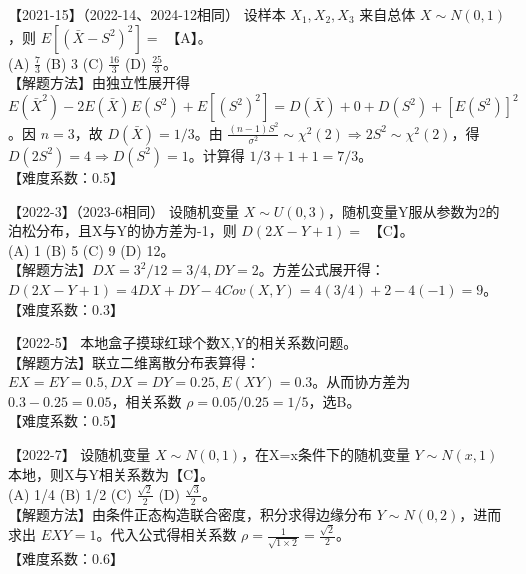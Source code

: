 \documentclass[zihao=4, a4paper, fontset=mac]{ctexart}
\begin{document}
\par\vspace{\baselineskip}

【2021-15】（2022-14、2024-12相同） 设样本 $X_1,X_2,X_3$ 来自总体 $X\sim N(0,1)$，则 $E[(\bar{X}-S^2)^2]=$ 【A】。\\
(A) $\frac{7}{3}$ \quad (B) 3 \quad (C) $\frac{16}{3}$ \quad (D) $\frac{25}{3}$。\\
【解题方法】由独立性展开得 $E(\bar{X}^2) - 2E(\bar{X})E(S^2) + E[(S^2)^2] = D(\bar{X}) + 0 + D(S^2) + [E(S^2)]^2$。因 $n=3$，故 $D(\bar{X})=1/3$。由 $\frac{(n-1)S^2}{\sigma^2} \sim \chi^2(2) \Rightarrow 2S^2 \sim \chi^2(2)$，得 $D(2S^2)=4 \Rightarrow D(S^2)=1$。计算得 $1/3 + 1 + 1 = 7/3$。\\
【难度系数：0.5】

\par\vspace{\baselineskip}

【2022-3】（2023-6相同） 设随机变量 $X\sim U(0,3)$，随机变量Y服从参数为2的泊松分布，且X与Y的协方差为-1，则 $D(2X-Y+1)=$ 【C】。\\
(A) 1 \quad (B) 5 \quad (C) 9 \quad (D) 12。\\
【解题方法】$DX = 3^2/12 = 3/4, DY = 2$。方差公式展开得：$D(2X-Y+1)=4DX+DY-4Cov(X,Y) = 4(3/4) + 2 - 4(-1) = 9$。\\
【难度系数：0.3】

\par\vspace{\baselineskip}

【2022-5】 本地盒子摸球红球个数X,Y的相关系数问题。\\
【解题方法】联立二维离散分布表算得：$EX=EY=0.5, DX=DY=0.25, E(XY)=0.3$。从而协方差为 $0.3-0.25=0.05$，相关系数 $\rho = 0.05/0.25 = 1/5$，选B。\\
【难度系数：0.5】

\par\vspace{\baselineskip}

【2022-7】 设随机变量 $X\sim N(0,1)$，在X=x条件下的随机变量 $Y\sim N(x,1)$本地，则X与Y相关系数为【C】。\\
(A) 1/4 \quad (B) 1/2 \quad (C) $\frac{\sqrt{2}}{2}$ \quad (D) $\frac{\sqrt{3}}{2}$。\\
【解题方法】由条件正态构造联合密度，积分求得边缘分布 $Y\sim N(0,2)$，进而求出 $EXY=1$。代入公式得相关系数 $\rho = \frac{1}{\sqrt{1 \times 2}} = \frac{\sqrt{2}}{2}$。\\
【难度系数：0.6】
\end{document}
